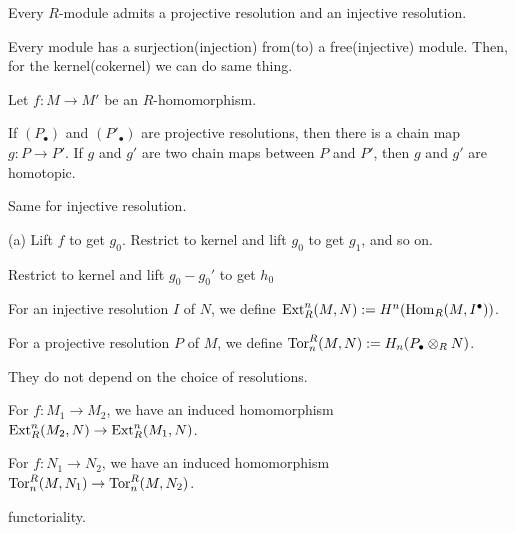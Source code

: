 \documentclass{../../small}
\begin{document}
\begin{prop*}[2.4.2]
Every $R$-module admits a projective resolution and an injective resolution.
\end{prop*}
\begin{pf}
Every module has a surjection(injection) from(to) a free(injective) module.
Then, for the kernel(cokernel) we can do same thing.
\end{pf}
\begin{prop*}[2.4.3]
Let $f:M\to M'$ be an $R$-homomorphism.
\begin{parts}
\item If $(P_\bullet)$ and $(P'_\bullet)$ are projective resolutions, then there is a chain map $g:P\to P'$. If $g$ and $g'$ are two chain maps between $P$ and $P'$, then $g$ and $g'$ are homotopic.
\item Same for injective resolution.
\end{parts}
\end{prop*}
\begin{pf}
(a) Lift $f$ to get $g_0$. Restrict to kernel and lift $g_0$ to get $g_1$, and so on.

Restrict to kernel and lift $g_0-g_0'$ to get $h_0$
\end{pf}

For an injective resolution $I$ of $N$, we define $\operatorname{Ext}_R^n(M,N):=H^n(\operatorname{Hom}_R(M,I^\bullet))$.

For a projective resolution $P$ of $M$, we define $\operatorname{Tor}_n^R(M,N):=H_n(P_\bullet\otimes_RN)$.

They do not depend on the choice of resolutions.

For $f:M_1\to M_2$, we have an induced homomorphism $\operatorname{Ext}_R^n(M_2,N)\to\operatorname{Ext}_R^n(M_1,N)$.

For $f:N_1\to N_2$, we have an induced homomorphism $\operatorname{Tor}_n^R(M,N_1)\to\operatorname{Tor}_n^R(M,N_2)$.

functoriality.
\end{document}
